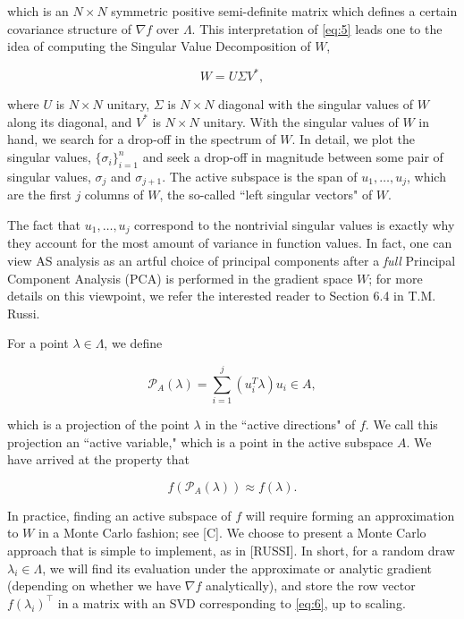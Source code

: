 \documentclass{amsart}
\begin{document}
\noindent which is an $N\times N$ symmetric positive semi-definite matrix which defines a certain covariance structure of $\nabla f$ over $\Lambda$. This interpretation of \eqref{eq:5} leads one to the idea of computing the Singular Value Decomposition of $W$,

\begin{equation} \label{eq:6}
W=U\Sigma V^*,
\end{equation} 

\noindent where $U$ is $N \times N$ unitary, $\Sigma$ is $N \times N$ diagonal with the singular values of $W$ along its diagonal, and $V^*$ is $N \times N$ unitary. With the singular values of $W$ in hand, we search for a drop-off in the spectrum of $W$. In detail, we plot the singular values, $\{\sigma_i\}_{i=1}^n$ and seek a drop-off in magnitude between some pair of singular values, $\sigma_{j}$ and $\sigma_{j+1}$. The active subspace is the span of $u_1,\ldots,u_{j}$, which are the first $j$ columns of $W$, the so-called ``left singular vectors" of $W$. 

The fact that $u_1,\ldots,u_{j}$ correspond to the nontrivial singular values is exactly why they account for the most amount of variance in function values. In fact, one can view AS analysis as an artful choice of principal components after a \textit{full} Principal Component Analysis (PCA) is performed in the gradient space $W$; for more details on this viewpoint, we refer the interested reader to Section 6.4 in T.M. Russi.

For a point $\lambda \in \Lambda$, we define

\begin{equation} \label{eq:7}
  \mathcal{P}_A(\lambda)=\sum_{i=1}^{j}\left( u_i^T \lambda\right)u_i \in A, 
\end{equation}

\noindent which is a projection of the point $\lambda$ in the ``active directions" of $f$. We call this projection an ``active variable," which is a point in the active subspace $A$. We have arrived at the property that 

\begin{equation} \label{eq:8}
f\left(\mathcal{P}_A(\lambda)\right) \approx f(\lambda).
\end{equation}

In practice, finding an active subspace of $f$ will require forming an approximation to $W$ in a Monte Carlo fashion; see [C]. We choose to present a Monte Carlo approach that is simple to implement, as in [RUSSI]. In short, for a random draw $\lambda_i \in \Lambda$, we will find its evaluation under the approximate or analytic gradient (depending on whether we have $\nabla f$ analytically), and store the row vector $f(\lambda_i)^\top$ in a matrix with an SVD corresponding to \eqref{eq:6}, up to scaling.
\end{document}
